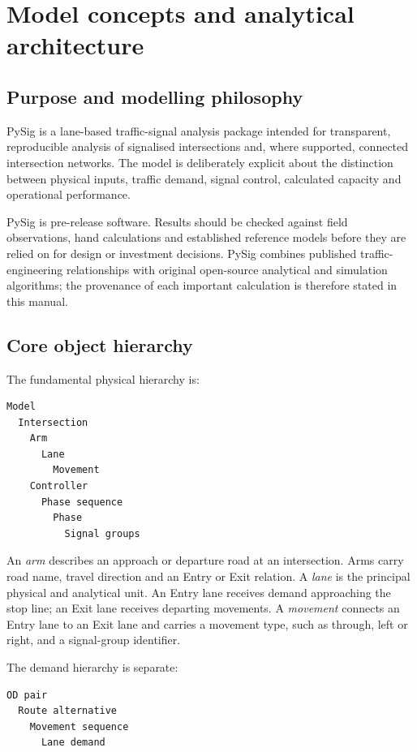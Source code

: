 \chapter{Model concepts and analytical architecture}
\label{chap:model-concepts}

\section{Purpose and modelling philosophy}
PySig is a lane-based traffic-signal analysis package intended for transparent,
reproducible analysis of signalised intersections and, where supported, connected
intersection networks.  The model is deliberately explicit about the distinction
between physical inputs, traffic demand, signal control, calculated capacity and
operational performance.

PySig is pre-release software.  Results should be checked against field observations,
hand calculations and established reference models before they are relied on for
design or investment decisions.  PySig combines published traffic-engineering
relationships with original open-source analytical and simulation algorithms; the
provenance of each important calculation is therefore stated in this manual.

\section{Core object hierarchy}
The fundamental physical hierarchy is:

\begin{verbatim}
Model
  Intersection
    Arm
      Lane
        Movement
    Controller
      Phase sequence
        Phase
          Signal groups
\end{verbatim}

An \emph{arm} describes an approach or departure road at an intersection.  Arms carry
road name, travel direction and an Entry or Exit relation.  A \emph{lane} is the
principal physical and analytical unit.  An Entry lane receives demand approaching the
stop line; an Exit lane receives departing movements.  A \emph{movement} connects an
Entry lane to an Exit lane and carries a movement type, such as through, left or right,
and a signal-group identifier.

The demand hierarchy is separate:

\begin{verbatim}
OD pair
  Route alternative
    Movement sequence
      Lane demand
\end{verbatim}


